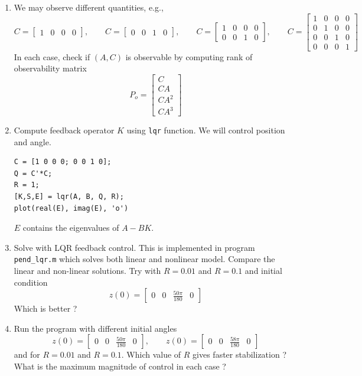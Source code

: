 \documentclass[12pt]{article}
\begin{document}
\begin{enumerate}

\item We may observe different quantities, e.g.,
\[
C = \begin{bmatrix}
1 & 0 & 0 & 0 
\end{bmatrix}, \qquad C = \begin{bmatrix}
0 & 0 & 1 & 0
\end{bmatrix}, \qquad C = \begin{bmatrix}
1 & 0 & 0 & 0 \\
0 & 0 & 1 & 0
\end{bmatrix}, \qquad C = \begin{bmatrix}
1 & 0 & 0 & 0 \\
0 & 1 & 0 & 0 \\
0 & 0 & 1 & 0 \\
0 & 0 & 0 & 1
\end{bmatrix}
\]
In each case, check if $(A,C)$ is observable by computing rank of observability matrix
\[
P_o = \begin{bmatrix}
C \\
CA \\
CA^2 \\
CA^3
\end{bmatrix}
\]

\item Compute feedback operator $K$ using {\tt lqr} function. We will control position and angle.
\begin{lstlisting}
C = [1 0 0 0; 0 0 1 0];
Q = C'*C;
R = 1;
[K,S,E] = lqr(A, B, Q, R);
plot(real(E), imag(E), 'o')
\end{lstlisting}
$E$ contains the eigenvalues of $A - B K$.

\item Solve with LQR feedback control. This is implemented in program {\tt pend\_lqr.m} which solves both linear and nonlinear model. Compare the linear and non-linear solutions. Try with $R=0.01$ and $R=0.1$ and initial condition
\[
z(0) = \begin{bmatrix}
0 & 0 & \frac{50 \pi}{180} & 0 
\end{bmatrix}
\]
Which is better ?

\item Run the program with different initial angles
\[
z(0) = \begin{bmatrix}
0 & 0 & \frac{50 \pi}{180} & 0 
\end{bmatrix}, \qquad z(0) = \begin{bmatrix}
0 & 0 & \frac{58 \pi}{180} & 0 
\end{bmatrix}
\]
and for $R=0.01$ and $R=0.1$. Which value of $R$ gives faster stabilization ? What is the maximum magnitude of control in each case ? 


\end{enumerate}
\end{document}
